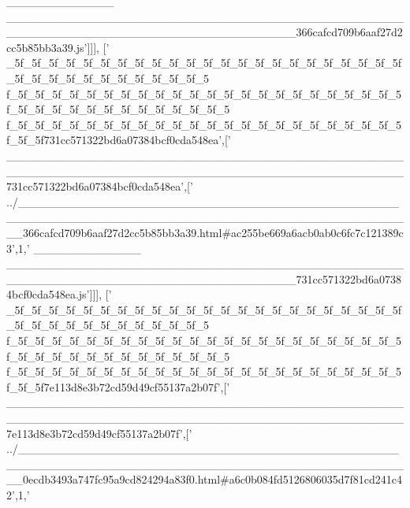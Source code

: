 \begin{DoxyCode}
{      \_\_\_\_\_\_\_\_\_\_\_\_\_
      \_\_\_\_\_\_\_\_\_\_\_\_\_\_\_\_\_\_\_\_\_\_\_\_\_\_\_\_\_\_\_\_\_\_\_\_\_\_\_\_\_\_\_\_\_\_\_\_\_\_\_\_\_\_\_\_\_\_\_\_\_\_\_\_\_\_\_\_\_\_\_\_\_\_\_\_\_\_\_\_\_\_\_366cafcd709b6aaf27d2cc5b85bb3a39.js'}]]],
  [\textcolor{stringliteral}{'
      \_5f\_5f\_5f\_5f\_5f\_5f\_5f\_5f\_5f\_5f\_5f\_5f\_5f\_5f\_5f\_5f\_5f\_5f\_5f\_5f\_5f\_5f\_5f\_5f\_5f\_5f\_5f\_5f\_5f\_5f\_5f\_5f\_5f\_5f\_5
      f\_5f\_5f\_5f\_5f\_5f\_5f\_5f\_5f\_5f\_5f\_5f\_5f\_5f\_5f\_5f\_5f\_5f\_5f\_5f\_5f\_5f\_5f\_5f\_5f\_5f\_5f\_5f\_5f\_5f\_5f\_5f\_5f\_5f\_5f\_5f\_5
      f\_5f\_5f\_5f\_5f\_5f\_5f\_5f\_5f\_5f\_5f\_5f\_5f\_5f\_5f\_5f\_5f\_5f\_5f\_5f\_5f\_5f\_5f\_5f\_5f\_5f731cc571322bd6a07384bcf0cda548ea'},[\textcolor{stringliteral}{'
      \_\_\_\_\_\_\_\_\_\_\_\_\_\_\_\_\_\_\_\_\_\_\_\_\_\_\_\_\_\_\_\_\_\_\_\_\_\_\_\_\_\_\_\_\_\_\_\_\_\_\_\_\_\_\_\_\_\_\_\_\_\_\_\_\_\_\_\_\_\_\_\_\_\_\_\_\_\_\_\_\_\_\_\_\_\_\_\_\_\_\_\_\_\_\_\_731cc571322bd6a07384bcf0cda548ea'},[\textcolor{stringliteral}{'
      ../\_\_\_\_\_\_\_\_\_\_\_\_\_\_\_\_\_\_\_\_\_\_\_\_\_\_\_\_\_\_\_\_\_\_\_\_\_\_\_\_\_\_\_\_\_\_\_\_\_\_\_\_\_\_\_\_\_\_\_\_\_\_\_\_\_\_\_\_\_\_\_\_\_\_\_\_\_\_\_\_\_\_\_\_\_\_\_\_\_\_\_\_\_\_\_\_366cafcd709b6aaf27d2cc5b85bb3a39.html#ac255be669a6acb0ab0c6fc7c121389c3'},1,\textcolor{stringliteral}{'
      \_\_\_\_\_\_\_\_\_\_\_\_\_
      \_\_\_\_\_\_\_\_\_\_\_\_\_\_\_\_\_\_\_\_\_\_\_\_\_\_\_\_\_\_\_\_\_\_\_\_\_\_\_\_\_\_\_\_\_\_\_\_\_\_\_\_\_\_\_\_\_\_\_\_\_\_\_\_\_\_\_\_\_\_\_\_\_\_\_\_\_\_\_\_\_\_\_731cc571322bd6a07384bcf0cda548ea.js'}]]],
  [\textcolor{stringliteral}{'
      \_5f\_5f\_5f\_5f\_5f\_5f\_5f\_5f\_5f\_5f\_5f\_5f\_5f\_5f\_5f\_5f\_5f\_5f\_5f\_5f\_5f\_5f\_5f\_5f\_5f\_5f\_5f\_5f\_5f\_5f\_5f\_5f\_5f\_5f\_5
      f\_5f\_5f\_5f\_5f\_5f\_5f\_5f\_5f\_5f\_5f\_5f\_5f\_5f\_5f\_5f\_5f\_5f\_5f\_5f\_5f\_5f\_5f\_5f\_5f\_5f\_5f\_5f\_5f\_5f\_5f\_5f\_5f\_5f\_5f\_5f\_5
      f\_5f\_5f\_5f\_5f\_5f\_5f\_5f\_5f\_5f\_5f\_5f\_5f\_5f\_5f\_5f\_5f\_5f\_5f\_5f\_5f\_5f\_5f\_5f\_5f\_5f7e113d8e3b72cd59d49cf55137a2b07f'},[\textcolor{stringliteral}{'
      \_\_\_\_\_\_\_\_\_\_\_\_\_\_\_\_\_\_\_\_\_\_\_\_\_\_\_\_\_\_\_\_\_\_\_\_\_\_\_\_\_\_\_\_\_\_\_\_\_\_\_\_\_\_\_\_\_\_\_\_\_\_\_\_\_\_\_\_\_\_\_\_\_\_\_\_\_\_\_\_\_\_\_\_\_\_\_\_\_\_\_\_\_\_\_\_7e113d8e3b72cd59d49cf55137a2b07f'},[\textcolor{stringliteral}{'
      ../\_\_\_\_\_\_\_\_\_\_\_\_\_\_\_\_\_\_\_\_\_\_\_\_\_\_\_\_\_\_\_\_\_\_\_\_\_\_\_\_\_\_\_\_\_\_\_\_\_\_\_\_\_\_\_\_\_\_\_\_\_\_\_\_\_\_\_\_\_\_\_\_\_\_\_\_\_\_\_\_\_\_\_\_\_\_\_\_\_\_\_\_\_\_\_\_0ecdb3493a747fc95a9cd824294a83f0.html#a6c0b084fd5126806035d7f81cd241c42'},1,\textcolor{stringliteral}{'
}
\end{DoxyCode}
